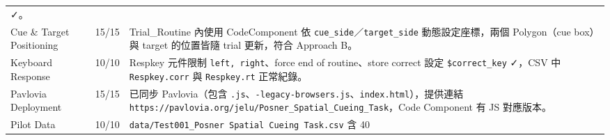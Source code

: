 \documentclass[14pt,]{extarticle}
\begin{document}
\begin{longtable}[]{@{}lll@{}}
\begin{minipage}[t]{0.09\columnwidth}
✓。\strut
\end{minipage}\tabularnewline
\begin{minipage}[t]{0.09\columnwidth}\raggedright
Cue \& Target Positioning\strut
\end{minipage} & \begin{minipage}[t]{0.09\columnwidth}\raggedright
15/15\strut
\end{minipage} & \begin{minipage}[t]{0.09\columnwidth}\raggedright
Trial\_Routine 內使用 CodeComponent 依
\texttt{cue\_side}／\texttt{target\_side} 動態設定座標，兩個
Polygon（cue box）與 target 的位置皆隨 trial 更新，符合 Approach
B。\strut
\end{minipage}\tabularnewline
\begin{minipage}[t]{0.09\columnwidth}\raggedright
Keyboard Response\strut
\end{minipage} & \begin{minipage}[t]{0.09\columnwidth}\raggedright
10/10\strut
\end{minipage} & \begin{minipage}[t]{0.09\columnwidth}\raggedright
Respkey 元件限制
\texttt{\textquotesingle{}left\textquotesingle{},\ \textquotesingle{}right\textquotesingle{}}、force
end of routine、store correct 設定 \texttt{\$correct\_key} ✓，CSV 中
\texttt{Respkey.corr} 與 \texttt{Respkey.rt} 正常紀錄。\strut
\end{minipage}\tabularnewline
\begin{minipage}[t]{0.09\columnwidth}\raggedright
Pavlovia Deployment\strut
\end{minipage} & \begin{minipage}[t]{0.09\columnwidth}\raggedright
15/15\strut
\end{minipage} & \begin{minipage}[t]{0.09\columnwidth}\raggedright
已同步 Pavlovia（包含
\texttt{.js}、\texttt{-legacy-browsers.js}、\texttt{index.html}），提供連結
\texttt{https://pavlovia.org/jelu/Posner\_Spatial\_Cueing\_Task}，Code
Component 有 JS 對應版本。\strut
\end{minipage}\tabularnewline
\begin{minipage}[t]{0.09\columnwidth}\raggedright
Pilot Data\strut
\end{minipage} & \begin{minipage}[t]{0.09\columnwidth}\raggedright
10/10\strut
\end{minipage} & \begin{minipage}[t]{0.09\columnwidth}\raggedright
\texttt{data/Test001\_Posner\ Spatial\ Cueing\ Task.csv} 含 40

\end{minipage}
\end{longtable}
\end{document}
